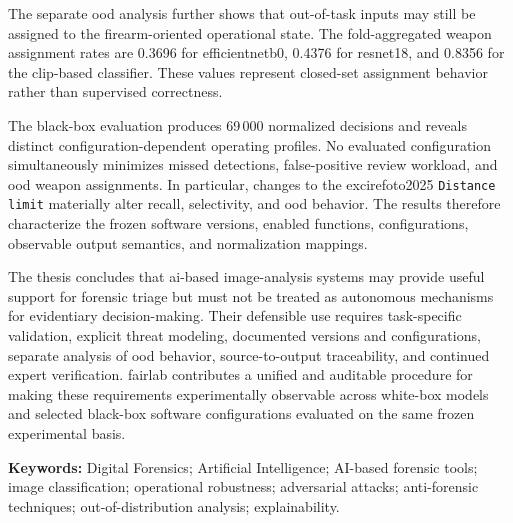 The separate \gls{ood} analysis further shows that out-of-task inputs may still
be assigned to the firearm-oriented operational state. The fold-aggregated
weapon assignment rates are 0.3696 for \gls{efficientnetb0},
0.4376 for \gls{resnet18}, and 0.8356 for the \gls{clip}-based classifier. These
values represent closed-set assignment behavior rather than supervised
correctness.

The black-box evaluation produces 69\,000 normalized decisions and reveals
distinct configuration-dependent operating profiles. No evaluated
configuration simultaneously minimizes missed detections, false-positive review
workload, and \gls{ood} weapon assignments. In particular, changes to the
\gls{excirefoto2025} \texttt{Distance limit} materially alter recall,
selectivity, and \gls{ood} behavior. The results therefore characterize the
frozen software versions, enabled functions, configurations, observable output
semantics, and normalization mappings.

The thesis concludes that \gls{ai}-based image-analysis systems may provide
useful support for forensic triage but must not be treated as autonomous
mechanisms for evidentiary decision-making. Their defensible use requires
task-specific validation, explicit threat modeling, documented versions and
configurations, separate analysis of \gls{ood} behavior, source-to-output
traceability, and continued expert verification. \gls{fairlab} contributes a
unified and auditable procedure for making these requirements experimentally
observable across white-box models and selected black-box software
configurations evaluated on the same frozen experimental basis.

\vfill

\noindent
\begin{minipage}{\textwidth}
\small
\raggedright
\textbf{Keywords:} Digital Forensics; Artificial Intelligence; AI-based forensic
tools; image classification; operational robustness; adversarial attacks;
anti-forensic techniques; out-of-distribution analysis; explainability.
\end{minipage}
